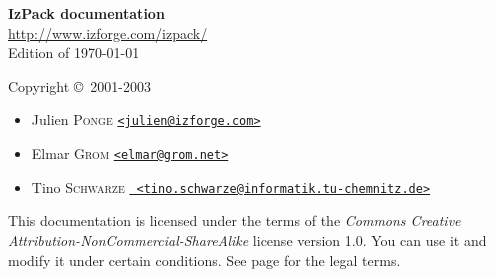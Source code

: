\begin{titlepage}

\begin{center}
\Huge
\textbf{IzPack documentation}\\[2em]
\normalsize
\href{http://www.izforge.com/izpack/}{\url{http://www.izforge.com/izpack/}}\\[2em]
Edition of \today
\end{center}

\vfill
\noindent Copyright \copyright\ 2001-2003
\begin{itemize}
\item Julien \textsc{Ponge} \href{mailto:julien@izforge.com}{\texttt{<julien@izforge.com>}}
\item Elmar \textsc{Grom} \href{mailto:elmar@grom.net}{\texttt{<elmar@grom.net>}} 
\item Tino \textsc{Schwarze} \href{mailto:tino.schwarze@informatik.tu-chemnitz.de}{\texttt{
                             <tino.schwarze@informatik.tu-chemnitz.de>}}
\end{itemize}

\vfill
\noindent
This documentation is licensed under the terms of the \textit{Commons Creative 
Attribution-NonCommercial-ShareAlike} license version 1.0. You can use it and
modify it under certain conditions. See page \pageref{CC-license} for the
legal terms.

\end{titlepage}
